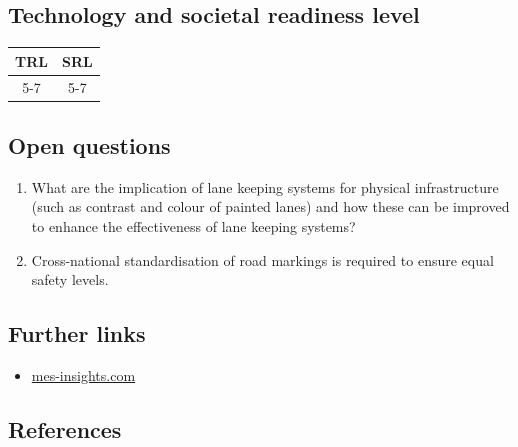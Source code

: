 \documentclass[
]{book}
\providecommand{\tightlist}{%
  \setlength{\itemsep}{0pt}\setlength{\parskip}{0pt}}
\begin{document}
\hypertarget{technology-and-societal-readiness-level-19}{%
\subsection*{Technology and societal readiness level}\label{technology-and-societal-readiness-level-19}}

\begin{longtable}[]{@{}cc@{}}
\toprule
TRL & SRL\tabularnewline
\midrule
\endhead
5-7 & 5-7\tabularnewline
\bottomrule
\end{longtable}

\hypertarget{open-questions-19}{%
\subsection*{Open questions}\label{open-questions-19}}

\begin{enumerate}
\def\labelenumi{\arabic{enumi}.}
\tightlist
\item
  What are the implication of lane keeping systems for physical infrastructure (such as contrast and colour of painted lanes) and how these can be improved to enhance the effectiveness of lane keeping systems?
\item
  Cross-national standardisation of road markings is required to ensure equal safety levels.
\end{enumerate}

\hypertarget{further-links-16}{%
\subsection*{Further links}\label{further-links-16}}

\begin{itemize}
\tightlist
\item
  \href{https://www.mes-insights.com/automated-lane-keeping-systems-pave-the-autonomous-car-future-a-965712/}{mes-insights.com}
\end{itemize}

\hypertarget{references-19}{%
\subsection*{References}\label{references-19}}
\end{document}
